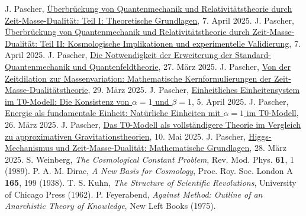 \documentclass[12pt,a4paper]{article}
\begin{document}
	\begin{thebibliography}{99}
		 J. Pascher, \href{https://github.com/jpascher/T0-Time-Mass-Duality/tree/main/2/pdf/Deutsch/QMRelZeitMasseTeil1.pdf}{Überbrückung von Quantenmechanik und Relativitätstheorie durch Zeit-Masse-Dualität: Teil I: Theoretische Grundlagen}, 7. April 2025.
		 J. Pascher, \href{https://github.com/jpascher/T0-Time-Mass-Duality/tree/main/2/pdf/Deutsch/QMRelZeitMasseTeil2.pdf}{Überbrückung von Quantenmechanik und Relativitätstheorie durch Zeit-Masse-Dualität: Teil II: Kosmologische Implikationen und experimentelle Validierung}, 7. April 2025.
		 J. Pascher, \href{https://github.com/jpascher/T0-Time-Mass-Duality/tree/main/2/pdf/Deutsch/NotwendigkeitQMErweiterung.pdf}{Die Notwendigkeit der Erweiterung der Standard-Quantenmechanik und Quantenfeldtheorie}, 27. März 2025.
		 J. Pascher, \href{https://github.com/jpascher/T0-Time-Mass-Duality/tree/main/2/pdf/Deutsch/MathZeitMasseLagrange.pdf}{Von der Zeitdilation zur Massenvariation: Mathematische Kernformulierungen der Zeit-Masse-Dualitätstheorie}, 29. März 2025.
		 J. Pascher, \href{https://github.com/jpascher/T0-Time-Mass-Duality/tree/main/2/pdf/Deutsch/Alpha1Beta1Konsistenz.pdf}{Einheitliches Einheitensystem im T0-Modell: Die Konsistenz von $\alpha = 1$ und $\beta = 1$}, 5. April 2025.
		 J. Pascher, \href{https://github.com/jpascher/T0-Time-Mass-Duality/tree/main/2/pdf/Deutsch/NatEinheitenAlpha1.pdf}{Energie als fundamentale Einheit: Natürliche Einheiten mit $\alpha = 1$ im T0-Modell}, 26. März 2025.
		 J. Pascher, \href{https://github.com/jpascher/T0-Time-Mass-Duality/tree/main/2/pdf/Deutsch/T0-ModellAlsVollstaendigeTheorie.pdf}{Das T0-Modell als vollständigere Theorie im Vergleich zu approximativen Gravitationstheorien}, 10. Mai 2025.
		 J. Pascher, \href{https://github.com/jpascher/T0-Time-Mass-Duality/tree/main/2/pdf/Deutsch/MathHiggsZeitMasse.pdf}{Higgs-Mechanismus und Zeit-Masse-Dualität: Mathematische Grundlagen}, 28. März 2025.
		 S. Weinberg, \textit{The Cosmological Constant Problem}, Rev. Mod. Phys. \textbf{61}, 1 (1989).
		 P. A. M. Dirac, \textit{A New Basis for Cosmology}, Proc. Roy. Soc. London A \textbf{165}, 199 (1938).
		 T. S. Kuhn, \textit{The Structure of Scientific Revolutions}, University of Chicago Press (1962).
		 P. Feyerabend, \textit{Against Method: Outline of an Anarchistic Theory of Knowledge}, New Left Books (1975).
	\end{thebibliography}
	
\end{document}
